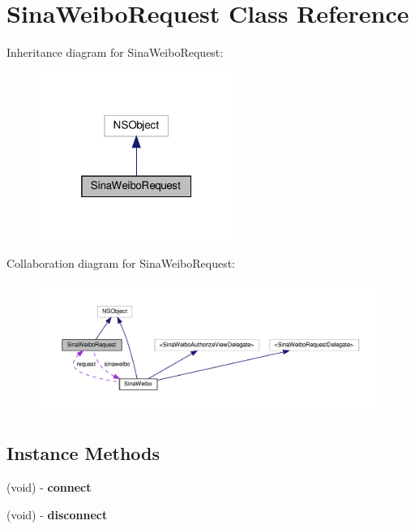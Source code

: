 \hypertarget{interfaceSinaWeiboRequest}{}\section{Sina\+Weibo\+Request Class Reference}
\label{interfaceSinaWeiboRequest}


Inheritance diagram for Sina\+Weibo\+Request\+:
\nopagebreak
\begin{figure}[H]
\begin{center}
\leavevmode
\includegraphics[width=181pt]{interfaceSinaWeiboRequest__inherit__graph}
\end{center}
\end{figure}


Collaboration diagram for Sina\+Weibo\+Request\+:
\nopagebreak
\begin{figure}[H]
\begin{center}
\leavevmode
\includegraphics[width=350pt]{interfaceSinaWeiboRequest__coll__graph}
\end{center}
\end{figure}
\subsection*{Instance Methods}
\begin{DoxyCompactItemize}
\item 
\mbox{\label{interfaceSinaWeiboRequest_adb6fe22805b8c34f4d8894d4efe97c74}} 
(void) -\/ {\bfseries connect}
\item 
\mbox{\label{interfaceSinaWeiboRequest_ae88eddf02c4ad62afd76e3ad73f04506}} 
(void) -\/ {\bfseries disconnect}
\end{DoxyCompactItemize}
